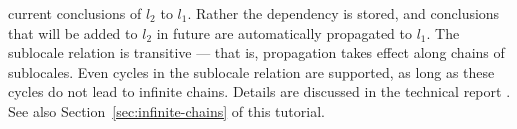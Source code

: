 \begin{isabellebody}
\begin{isamarkuptext}
  current conclusions of $l_2$ to $l_1$.  Rather the dependency is
  stored, and conclusions that will be
  added to $l_2$ in future are automatically propagated to $l_1$.
  The sublocale relation is transitive --- that is, propagation takes
  effect along chains of sublocales.  Even cycles in the sublocale relation are
  supported, as long as these cycles do not lead to infinite chains.
  Details are discussed in the technical report \cite{Ballarin2006a}.
  See also Section~\ref{sec:infinite-chains} of this tutorial.%
\end{isamarkuptext}%
\isamarkuptrue%
%
\isadelimtheory
%
\endisadelimtheory
%
\isatagtheory
{}\isamarkupfalse%
%
\endisatagtheory
{\isafoldtheory}%
%
\isadelimtheory
%
\endisadelimtheory
\isanewline
\end{isabellebody}%
